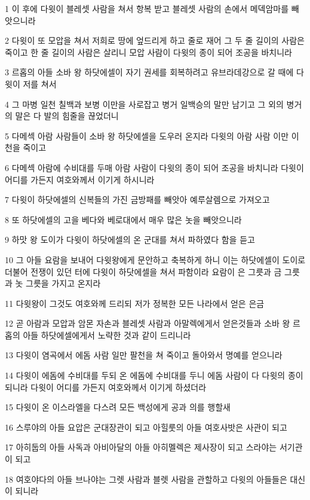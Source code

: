 \par 1 이 후에 다윗이 블레셋 사람을 쳐서 항복 받고 블레셋 사람의 손에서 메덱암마를 빼앗으니라
\par 2 다윗이 또 모압을 쳐서 저희로 땅에 엎드리게 하고 줄로 재어 그 두 줄 길이의 사람은 죽이고 한 줄 길이의 사람은 살리니 모압 사람이 다윗의 종이 되어 조공을 바치니라
\par 3 르홉의 아들 소바 왕 하닷에셀이 자기 권세를 회복하려고 유브라데강으로 갈 때에 다윗이 저를 쳐서
\par 4 그 마병 일천 칠백과 보병 이만을 사로잡고 병거 일백승의 말만 남기고 그 외의 병거의 말은 다 발의 힘줄을 끊었더니
\par 5 다메섹 아람 사람들이 소바 왕 하닷에셀을 도우러 온지라 다윗의 아람 사람 이만 이천을 죽이고
\par 6 다메섹 아람에 수비대를 두매 아람 사람이 다윗의 종이 되어 조공을 바치니라 다윗이 어디를 가든지 여호와께서 이기게 하시니라
\par 7 다윗이 하닷에셀의 신복들의 가진 금방패를 빼앗아 예루살렘으로 가져오고
\par 8 또 하닷에셀의 고을 베다와 베로대에서 매우 많은 놋을 빼앗으니라
\par 9 하맛 왕 도이가 다윗이 하닷에셀의 온 군대를 쳐서 파하였다 함을 듣고
\par 10 그 아들 요람을 보내어 다윗왕에게 문안하고 축복하게 하니 이는 하닷에셀이 도이로 더불어 전쟁이 있던 터에 다윗이 하닷에셀을 쳐서 파함이라 요람이 은 그릇과 금 그릇과 놋 그릇을 가지고 온지라
\par 11 다윗왕이 그것도 여호와께 드리되 저가 정복한 모든 나라에서 얻은 은금
\par 12 곧 아람과 모압과 암몬 자손과 블레셋 사람과 아말렉에게서 얻은것들과 소바 왕 르홉의 아들 하닷에셀에게서 노략한 것과 같이 드리니라
\par 13 다윗이 염곡에서 에돔 사람 일만 팔천을 쳐 죽이고 돌아와서 명예를 얻으니라
\par 14 다윗이 에돔에 수비대를 두되 온 에돔에 수비대를 두니 에돔 사람이 다 다윗의 종이 되니라 다윗이 어디를 가든지 여호와께서 이기게 하셨더라
\par 15 다윗이 온 이스라엘을 다스려 모든 백성에게 공과 의를 행할새
\par 16 스루야의 아들 요압은 군대장관이 되고 아힐룻의 아들 여호사밧은 사관이 되고
\par 17 아히둡의 아들 사독과 아비아달의 아들 아히멜렉은 제사장이 되고 스라야는 서기관이 되고
\par 18 여호야다의 아들 브나야는 그렛 사람과 블렛 사람을 관할하고 다윗의 아들들은 대신이 되니라

